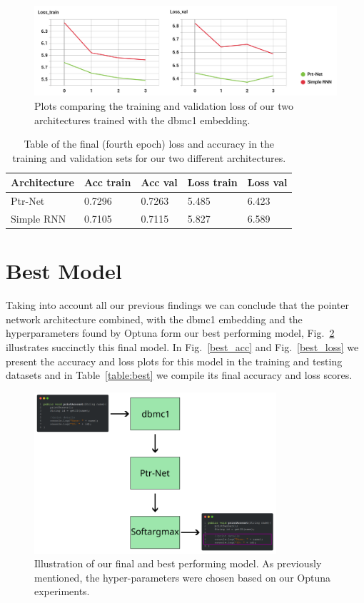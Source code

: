 \begin{figure}[!ht]
\centerline{\includegraphics[width=1.1\textwidth]{figuras/arquiteturas_-Loss.png}   }
\caption{Plots comparing the training and validation loss of our two architectures trained with the dbmc1 embedding.}
\label{arq_loss}
\end{figure}

\begin{table}[]
\begin{tabular}{l|llll}
Architecture & Acc train & Acc val & Loss train & Loss val \\ \hline
Ptr-Net      & 0.7296    & 0.7263  & 5.485      & 6.423    \\
Simple RNN   & 0.7105    & 0.7115  & 5.827      & 6.589   
\end{tabular}
\caption{Table of the final (fourth epoch) loss and accuracy in the training and validation sets for our two different architectures.}
\label{table:arq}
\end{table}

\section{Best Model}

Taking into account all our previous findings we can conclude that the pointer network architecture combined, with the dbmc1 embedding and the hyperparameters found by Optuna form our best performing model, Fig.~\ref{fig:final_model} illustrates succinctly this final model.  In Fig.~\ref{best_acc} and Fig.~\ref{best_loss} we present the accuracy and loss plots for this model in the training and testing datasets and in Table~\ref{table:best} we compile its final accuracy and loss scores.


\begin{figure}[!ht]
\centerline{\includegraphics[width=0.8\textwidth]{figuras/final_model.png}   }
\caption{Illustration of our final and best performing model. As previously mentioned, the hyper-parameters were chosen based on our Optuna experiments.}
\label{fig:final_model}
\end{figure}

